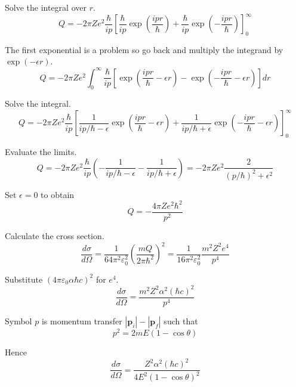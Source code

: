 Solve the integral over $r$.
\begin{equation*}
Q=-2\pi Ze^2\frac{\hbar}{ip}
\left[
\frac{\hbar}{ip}
\exp\left(\frac{ipr}{\hbar}\right)
+\frac{\hbar}{ip}
\exp\left(-\frac{ipr}{\hbar}\right)
\right]_0^\infty
\end{equation*}

The first exponential is a problem
so go back and multiply the integrand by $\exp(-\epsilon r)$.
\begin{equation*}
Q=-2\pi Ze^2
\int_0^\infty
\frac{\hbar}{ip}
\left[\exp\left(\frac{ipr}{\hbar}-\epsilon r\right)
-\exp\left(-\frac{ipr}{\hbar}-\epsilon r\right)\right]
dr
\end{equation*}

Solve the integral.
\begin{equation*}
Q=-2\pi Ze^2
\frac{\hbar}{ip}
\left[
\frac{1}{ip/\hbar-\epsilon}\exp\left(\frac{ipr}{\hbar}-\epsilon r\right)
+\frac{1}{ip/\hbar+\epsilon}\exp\left(-\frac{ipr}{\hbar}-\epsilon r\right)
\right]_0^\infty
\end{equation*}

Evaluate the limits.
\begin{equation*}
Q=-2\pi Ze^2
\frac{\hbar}{ip}
\left(-\frac{1}{ip/\hbar-\epsilon}-\frac{1}{ip/\hbar+\epsilon}\right)
=-2\pi Ze^2\frac{2}{(p/\hbar)^2+\epsilon^2}
\tag{1}
\end{equation*}

Set $\epsilon=0$ to obtain
\begin{equation*}
Q=-\frac{4\pi Ze^2\hbar^2}{p^2}
\end{equation*}

Calculate the cross section.
\begin{equation*}
\frac{d\sigma}{d\Omega}=\frac{1}{64\pi^2\varepsilon_0^2}\left(\frac{mQ}{2\pi\hbar^2}\right)^2
=\frac{1}{16\pi^2\varepsilon_0^2}\frac{m^2Z^2e^4}{p^4}
\tag{2}
\end{equation*}

Substitute $(4\pi\varepsilon_0\alpha\hbar c)^2$ for $e^4$.
\begin{equation*}
\frac{d\sigma}{d\Omega}=\frac{m^2Z^2\alpha^2(\hbar c)^2}{p^4}
\end{equation*}

Symbol $p$ is momentum transfer $|\mathbf p_i|-|\mathbf p_f|$ such that
\begin{equation*}
p^2=2mE(1-\cos\theta)
\end{equation*}

Hence
\begin{equation*}
\frac{d\sigma}{d\Omega}=\frac{Z^2\alpha^2(\hbar c)^2}{4E^2(1-\cos\theta)^2}
\tag{3}
\end{equation*}

